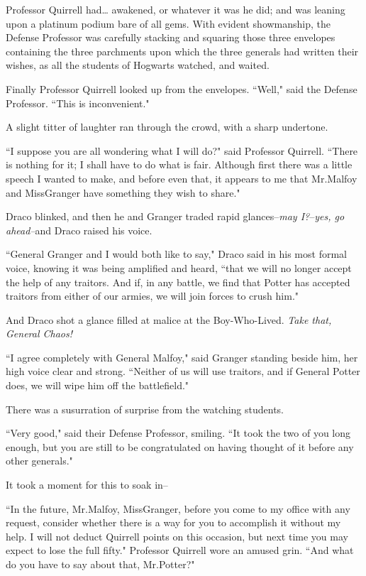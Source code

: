 Professor Quirrell had{\ldots} awakened, or whatever it was he did; and was leaning upon a platinum podium bare of all gems. With evident showmanship, the Defense Professor was carefully stacking and squaring those three envelopes containing the three parchments upon which the three generals had written their wishes, as all the students of Hogwarts watched, and waited.

Finally Professor Quirrell looked up from the envelopes. ``Well," said the Defense Professor. ``This is inconvenient."

A slight titter of laughter ran through the crowd, with a sharp undertone.

``I suppose you are all wondering what I will do?" said Professor Quirrell. ``There is nothing for it; I shall have to do what is fair. Although first there was a little speech I wanted to make, and before even that, it appears to me that Mr.\?Malfoy and Miss\?Granger have something they wish to share."

Draco blinked, and then he and Granger traded rapid glances\---\emph{may I?}\---\emph{yes, go ahead\---}and Draco raised his voice.

``General Granger and I would both like to say," Draco said in his most formal voice, knowing it was being amplified and heard, ``that we will no longer accept the help of any traitors. And if, in any battle, we find that Potter has accepted traitors from either of our armies, we will join forces to crush him."

And Draco shot a glance filled at malice at the Boy-Who-Lived. \emph{Take that, General Chaos!}

``I agree completely with General Malfoy," said Granger standing beside him, her high voice clear and strong. ``Neither of us will use traitors, and if General Potter does, we will wipe him off the battlefield."

There was a susurration of surprise from the watching students.

``Very good," said their Defense Professor, smiling. ``It took the two of you long enough, but you are still to be congratulated on having thought of it before any other generals."

It took a moment for this to soak in\---

``In the future, Mr.\?Malfoy, Miss\?Granger, before you come to my office with any request, consider whether there is a way for you to accomplish it without my help. I will not deduct Quirrell points on this occasion, but next time you may expect to lose the full fifty." Professor Quirrell wore an amused grin. ``And what do you have to say about that, Mr.\?Potter?"

